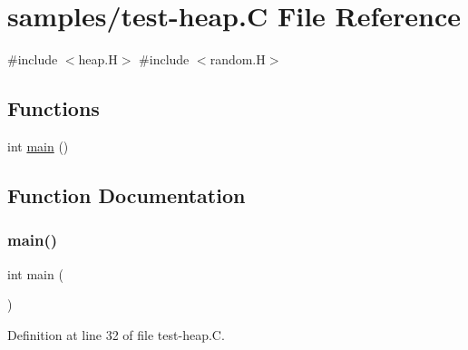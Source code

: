 \hypertarget{test-heap_8_c}{}\section{samples/test-\/heap.C File Reference}
\label{test-heap_8_c}
{\ttfamily \#include $<$heap.\+H$>$}\newline
{\ttfamily \#include $<$random.\+H$>$}\newline
\subsection*{Functions}
\begin{DoxyCompactItemize}
\item 
int \hyperlink{test-heap_8_c_ae66f6b31b5ad750f1fe042a706a4e3d4}{main} ()
\end{DoxyCompactItemize}


\subsection{Function Documentation}
\mbox{\label{test-heap_8_c_ae66f6b31b5ad750f1fe042a706a4e3d4}} 
\subsubsection{\texorpdfstring{main()}{main()}}
{\footnotesize\ttfamily int main (\begin{DoxyParamCaption}{ }\end{DoxyParamCaption})}



Definition at line 32 of file test-\/heap.\+C.

